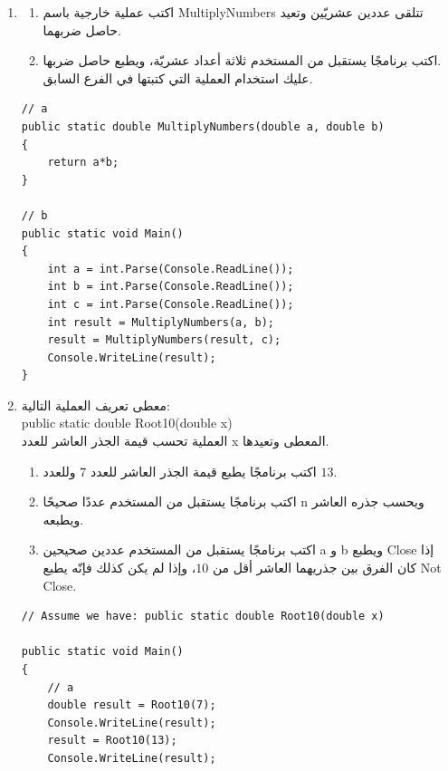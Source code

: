 ﻿\documentclass[12pt]{article}
\begin{document}
\begin{enumerate}[itemsep=3em]
\begin{enumerate}
\clearpage
\item
\begin{enumerate}
    \item اكتب عملية خارجية باسم \textenglish{MultiplyNumbers} تتلقى عددين عشريّين وتعيد حاصل ضربهما.
    \item اكتب برنامجًا يستقبل من المستخدم ثلاثة أعداد عشريّة، ويطبع حاصل ضربها. \\
    عليك استخدام العملية التي كتبتها في الفرع السابق.
\end{enumerate}
\ifwithsols
\begin{boxSolution}
\begin{english}
\begin{verbatim}
// a
public static double MultiplyNumbers(double a, double b)
{
    return a*b;
}

// b
public static void Main()
{
    int a = int.Parse(Console.ReadLine());
    int b = int.Parse(Console.ReadLine());
    int c = int.Parse(Console.ReadLine());
    int result = MultiplyNumbers(a, b);
    result = MultiplyNumbers(result, c);
    Console.WriteLine(result);
}
\end{verbatim}
\end{english}
\end{boxSolution}
\clearpage
\fi

\item
معطى تعريف العملية التالية: \\
\textenglish{public static double Root10(double x)} \\
العملية تحسب قيمة الجذر العاشر للعدد \textenglish{x} المعطى وتعيدها.

\begin{enumerate}
\item اكتب برنامجًا يطبع قيمة الجذر العاشر للعدد $7$ وللعدد $13$.
\item اكتب برنامجًا يستقبل من المستخدم عددًا صحيحًا \textenglish{n} ويحسب جذره العاشر ويطبعه.
\item اكتب برنامجًا يستقبل من المستخدم عددين صحيحين \textenglish{a} و \textenglish{b} ويطبع \textenglish{Close} إذا كان الفرق بين جذريهما العاشر أقل من $10$، وإذا لم يكن كذلك فإنّه يطبع \textenglish{Not Close}.
\end{enumerate}

\ifwithsols
\begin{boxSolution}
\begin{english}
\begin{verbatim}
// Assume we have: public static double Root10(double x)

public static void Main()
{
    // a
    double result = Root10(7);
    Console.WriteLine(result);
    result = Root10(13);
    Console.WriteLine(result);


\end{verbatim}
\end{english}
\end{boxSolution}
\end{enumerate}
\end{enumerate}
\end{document}
